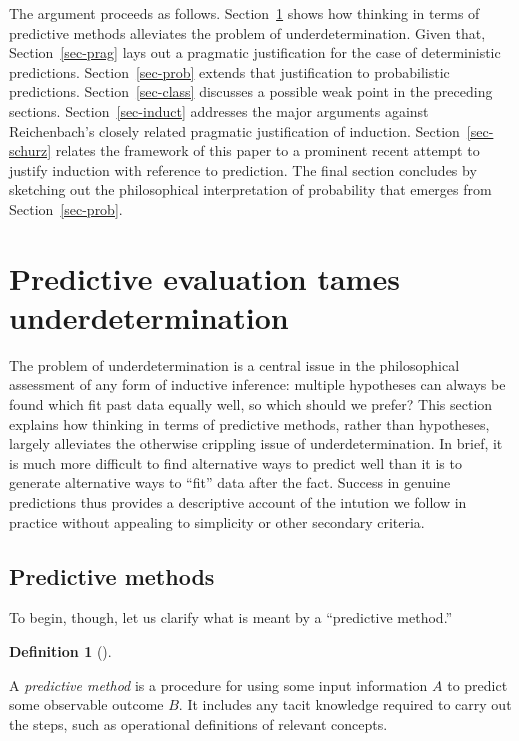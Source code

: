 \documentclass[
  letterpaper,
  DIV=11,
  numbers=noendperiod]{scrartcl}
\theoremstyle{definition}
\newtheorem{definition}{Definition}[section]
\theoremstyle{remark}
\begin{document}
The argument proceeds as follows. Section~\ref{sec-under} shows how
thinking in terms of predictive methods alleviates the problem of
underdetermination. Given that, Section~\ref{sec-prag} lays out a
pragmatic justification for the case of deterministic predictions.
Section~\ref{sec-prob} extends that justification to probabilistic
predictions. Section~\ref{sec-class} discusses a possible weak point in
the preceding sections. Section~\ref{sec-induct} addresses the major
arguments against Reichenbach's closely related pragmatic justification
of induction. Section~\ref{sec-schurz} relates the framework of this
paper to a prominent recent attempt to justify induction with reference
to prediction. The final section concludes by sketching out the
philosophical interpretation of probability that emerges from
Section~\ref{sec-prob}.

\section{Predictive evaluation tames
underdetermination}\label{sec-under}

The problem of underdetermination is a central issue in the
philosophical assessment of any form of inductive inference: multiple
hypotheses can always be found which fit past data equally well, so
which should we prefer? This section explains how thinking in terms of
predictive methods, rather than hypotheses, largely alleviates the
otherwise crippling issue of underdetermination. In brief, it is much
more difficult to find alternative ways to predict well than it is to
generate alternative ways to ``fit'' data after the fact. Success in
genuine predictions thus provides a descriptive account of the intution
we follow in practice without appealing to simplicity or other secondary
criteria.

\subsection{Predictive methods}\label{predictive-methods}

To begin, though, let us clarify what is meant by a ``predictive
method.''

\begin{definition}[]\protect\hypertarget{def-predictive}{}\label{def-predictive}

A \emph{predictive method} is a procedure for using some input
information \(A\) to predict some observable outcome \(B\). It includes
any tacit knowledge required to carry out the steps, such as operational
definitions of relevant concepts.

\end{definition}
\end{document}
